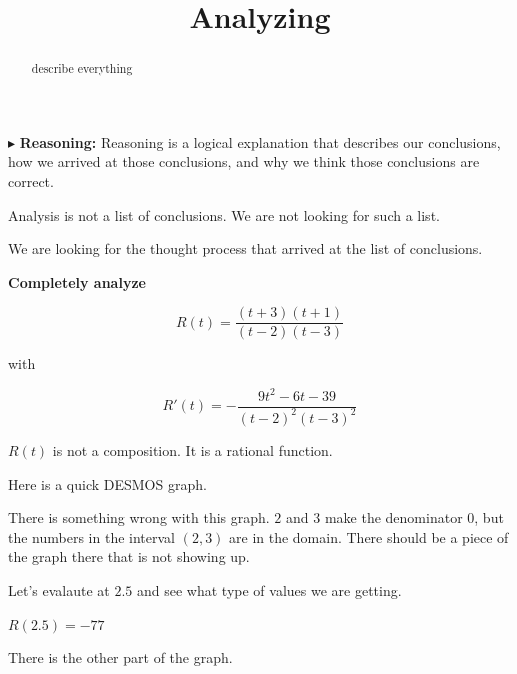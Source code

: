 \documentclass{ximera}
\title{Analyzing}
\begin{document}
\begin{abstract}
describe everything
\end{abstract}
\maketitle







$\blacktriangleright$ \textbf{\textcolor{red!70!black}{Reasoning:}} Reasoning is a logical explanation that describes our conclusions, how we arrived at those conclusions, and why we think those conclusions are correct. 

Analysis is not a list of conclusions. We are not looking for such a list. 

We are looking for the thought process that arrived at the list of conclusions. 











\textbf{\textcolor{purple!85!blue}{Completely analyze}} 


\[   R(t) = \frac{(t+3)(t+1)}{(t-2)(t-3)} \]

with 

\[   R'(t) = -\frac{9 t^2 -6 t -39}{(t-2)^2 (t-3)^2} \]



$R(t)$ is not a composition. It is a rational function. 


Here is a quick DESMOS graph.


\begin{center}
\end{center}


There is something wrong with this graph.  $2$ and $3$ make the denominator $0$, but the numbers in the interval $(2, 3)$ are in the domain.  There should be a piece of the graph there that is not showing up.


Let's evalaute at $2.5$ and see what type of values we are getting. 

$R(2.5) = -77$


\begin{center}
\end{center}


There is the other part of the graph. 
\end{document}
